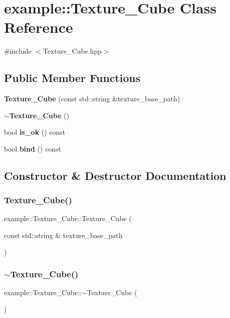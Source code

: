 \section{example\+::Texture\+\_\+\+Cube Class Reference}
\label{classexample_1_1_texture___cube}


{\ttfamily \#include $<$Texture\+\_\+\+Cube.\+hpp$>$}

\subsection*{Public Member Functions}
\begin{DoxyCompactItemize}
\item 
\textbf{ Texture\+\_\+\+Cube} (const std\+::string \&texture\+\_\+base\+\_\+path)
\item 
\textbf{ $\sim$\+Texture\+\_\+\+Cube} ()
\item 
bool \textbf{ is\+\_\+ok} () const
\item 
bool \textbf{ bind} () const
\end{DoxyCompactItemize}


\subsection{Constructor \& Destructor Documentation}
\mbox{\label{classexample_1_1_texture___cube_a3661927d4b4b5f7877b699fed5f6122a}} 
\subsubsection{Texture\_Cube()}
{\footnotesize\ttfamily example\+::\+Texture\+\_\+\+Cube\+::\+Texture\+\_\+\+Cube (\begin{DoxyParamCaption}\item[{const std\+::string \&}]{texture\+\_\+base\+\_\+path }\end{DoxyParamCaption})}

\mbox{\label{classexample_1_1_texture___cube_a3d6c6153b1384fe211b27942490483c1}} 
\subsubsection{$\sim$Texture\_Cube()}
{\footnotesize\ttfamily example\+::\+Texture\+\_\+\+Cube\+::$\sim$\+Texture\+\_\+\+Cube (\begin{DoxyParamCaption}{ }\end{DoxyParamCaption})}



